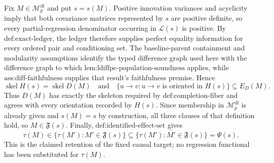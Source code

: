 Fix \(M\in\mathcal M_p^{\mathrm{df}}\) and put \(s=s(M)\).  Positive innovation variances and acyclicity imply that both covariance matrices represented by \(s\) are positive definite, so every partial-regression denominator occurring in \(\mathcal L(s)\) is positive.  By \(\text{def:exact-ledger}\), the ledger therefore supplies perfect equality information for every ordered pair and conditioning set.  The baseline-parent containment and modularity assumptions identify the typed difference graph used here with the difference graph to which \(\text{lem:ldiffpc-population-soundness}\) applies, while \(\text{ass:diff-faithfulness}\) supplies that result's faithfulness premise.  Hence
\[
 \operatorname{skel} H(s)=\operatorname{skel}D(M)
 \quad\text{and}\quad
 \{u\to v:u\to v\text{ is oriented in }H(s)\}
 \subseteq E_D(M).
\]
Thus \(D(M)\) has exactly the skeleton required by \(\text{def:completion-fiber}\) and agrees with every orientation recorded by \(H(s)\).  Since membership in \(\mathcal M_p^{\mathrm{df}}\) is already given and \(s(M)=s\) by construction, all three clauses of that definition hold, so \(M\in\mathfrak F(s)\).  Finally, \(\text{def:identified-effect-set}\) gives
\[
 \tau(M)\in\{\tau(M'):M'\in\mathfrak F(s)\}
 \subseteq\overline{\{\tau(M'):M'\in\mathfrak F(s)\}}=\Psi(s).
\]
This is the claimed retention of the fixed causal target; no regression functional has been substituted for \(\tau(M)\).